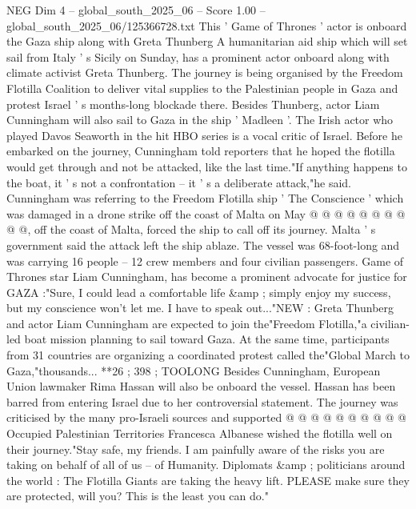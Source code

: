 \begin{textsample}{NEG Dim 4 – global\_south\_2025\_06 – Score 1.00 – global\_south\_2025\_06/125366728.txt}  \label{ex:f4_neg_105}
This ' Game of Thrones ' actor is onboard the Gaza ship along with Greta Thunberg A humanitarian aid ship which will set sail from Italy ' s Sicily on Sunday, has a prominent actor onboard along with climate activist Greta Thunberg.
The journey is being organised by the Freedom Flotilla Coalition to deliver vital supplies to the Palestinian people in Gaza and protest Israel ' s months-long blockade there.
Besides Thunberg, actor Liam Cunningham will also sail to Gaza in the ship ' Madleen '.
The Irish actor who played Davos Seaworth in the hit HBO series is a vocal critic of Israel.
Before he embarked on the journey, Cunningham told reporters that he hoped the flotilla would get through and not be attacked, like the last time."If anything happens to the boat, it ' s not a confrontation -- it ' s a deliberate attack,"he said.
Cunningham was referring to the Freedom Flotilla ship ' The Conscience ' which was damaged in a drone strike off the coast of Malta on May @ @ @ @ @ @ @ @ @ @, off the coast of Malta, forced the ship to call off its journey.
Malta ' s government said the attack left the ship ablaze.
The vessel was 68-foot-long and was carrying 16 people -- 12 crew members and four civilian passengers.
Game of Thrones star Liam Cunningham, has become a prominent advocate for justice for GAZA :"Sure, I could lead a comfortable life \&amp ; simply enjoy my success, but my conscience won't let me.
I have to speak out..."NEW : Greta Thunberg and actor Liam Cunningham are expected to join the"Freedom Flotilla,"a civilian-led boat mission planning to sail toward Gaza.
At the same time, participants from 31 countries are organizing a coordinated protest called the"Global March to Gaza,"thousands... **26 ; 398 ; TOOLONG Besides Cunningham, European Union lawmaker Rima Hassan will also be onboard the vessel.
Hassan has been barred from entering Israel due to her controversial statement.
The journey was criticised by the many pro-Israeli sources and supported @ @ @ @ @ @ @ @ @ @ Occupied Palestinian Territories Francesca Albanese wished the flotilla well on their journey."Stay safe, my friends.
I am painfully aware of the risks you are taking on behalf of all of us -- of Humanity.
Diplomats \&amp ; politicians around the world : The Flotilla Giants are taking the heavy lift.
PLEASE make sure they are protected, will you?
This is the least you can do."

\end{textsample}
